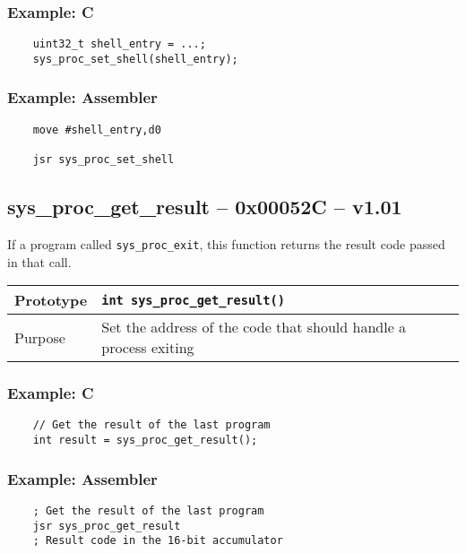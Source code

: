 \subsubsection*{Example: C}
\begin{lstlisting}
    uint32_t shell_entry = ...;
    sys_proc_set_shell(shell_entry);
\end{lstlisting}

\subsubsection*{Example: Assembler}
\begin{verbatim}
    move #shell_entry,d0

    jsr sys_proc_set_shell
\end{verbatim}


\subsection*{sys\_proc\_get\_result -- 0x00052C -- v1.01}
If a program called \lstinline|sys_proc_exit|, this function returns the result code passed in that call.

\begin{table}[!h]\begin{tabular}{|l||l|} \hline
Prototype & \lstinline!int sys_proc_get_result()! \\ \hline
Purpose & Set the address of the code that should handle a process exiting \\ \hline
\end{tabular}\end{table}

\subsubsection*{Example: C}
\begin{lstlisting}
    // Get the result of the last program
    int result = sys_proc_get_result();	
\end{lstlisting}

\subsubsection*{Example: Assembler}
\begin{verbatim}
    ; Get the result of the last program
    jsr sys_proc_get_result
    ; Result code in the 16-bit accumulator
\end{verbatim}


